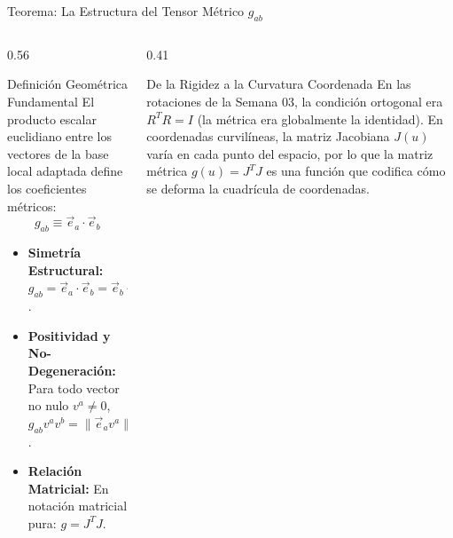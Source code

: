 \documentclass[10pt,aspectratio=169]{beamer}
\begin{document}
\begin{frame}{Teorema: La Estructura del Tensor Métrico $g_{ab}$}
  \begin{columns}[c]
    \begin{column}{0.56\textwidth}
      \footnotesize
      \begin{block}{Definición Geométrica Fundamental}
        El producto escalar euclidiano entre los vectores de la base local adaptada define los coeficientes métricos:
        \[
        \boxed{g_{ab} \equiv \vec{e}_a \cdot \vec{e}_b}
        \]
      \end{block}
      \begin{itemize}\itemsep2pt
        \item \textbf{Simetría Estructural:}
        $g_{ab} = \vec{e}_a \cdot \vec{e}_b = \vec{e}_b \cdot \vec{e}_a = g_{ba}$.
        \item \textbf{Positividad y No-Degeneración:}
        Para todo vector no nulo $v^a \neq 0$, $g_{ab}v^a v^b = \|\vec{e}_a v^a\|^2 > 0$.
        \item \textbf{Relación Matricial:}
        En notación matricial pura: $\boxed{g = J^T J}$.
      \end{itemize}
    \end{column}
    \begin{column}{0.41\textwidth}
      \footnotesize
      \begin{block}{De la Rigidez a la Curvatura Coordenada}
        \scriptsize
        En las rotaciones de la Semana 03, la condición ortogonal era $R^T R = I$ (la métrica era globalmente la identidad).
        \vskip4pt
        En coordenadas curvilíneas, la matriz Jacobiana $J(u)$ varía en cada punto del espacio, por lo que la matriz métrica $g(u) = J^T J$ es una función que codifica cómo se deforma la cuadrícula de coordenadas.
      \end{block}
    \end{column}
  \end{columns}
\end{frame}
\end{document}
